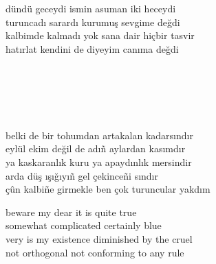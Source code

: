 \documentclass[10pt, openright, oneside]{memoir}
\theoremstyle{definition}
\begin{document}
\vspace*{\fill}
%
\newpage
{}
\vspace*{\fill}
\settowidth{\versewidth}{kalbimde kalmadı yok sana dair hiçbir tasvir}
\begin{cverse}
  dündü geceydi ismin asuman iki heceydi \\
  turuncadı sarardı kurumuş sevgime değdi \\
  kalbimde kalmadı yok sana dair hiçbir tasvir \\
  hatırlat kendini de diyeyim canıma değdi \\
\end{cverse}
\vspace*{\fill}
%
\newpage
{}
\vspace*{\fill}
\begin{cverse}
  \phantom{}\\
  \phantom{}\\
  \phantom{}\\
  \phantom{}\\
\end{cverse}
\vspace*{\fill}
%
\newpage
{}
\vspace*{\fill}
\settowidth{\versewidth}{çûn kalbi\~ne girmekle ben çok turuncular yakdım}
\begin{cverse}
  belki de bir tohumdan artakalan kadarsındır \\
  eylül ekim değil de adı\~n aylardan kasımdır \\
  ya kaskaranlık kuru ya apaydınlık mersindir \\
  arda düş ışığıyı\~n gel çekince\~ni sındır \\
  çûn kalbi\~ne girmekle ben çok turuncular yakdım \\
\end{cverse}
\vspace*{\fill}
%
\newpage
{}
\vspace*{\fill}
\settowidth{\versewidth}{very is my existence diminished by the cruel}
\begin{cverse}
  beware my dear it is quite true \\
  somewhat complicated certainly blue \\
  very is my existence diminished by the cruel \\
  not orthogonal not conforming to any rule \\
\end{cverse}
\end{document}
